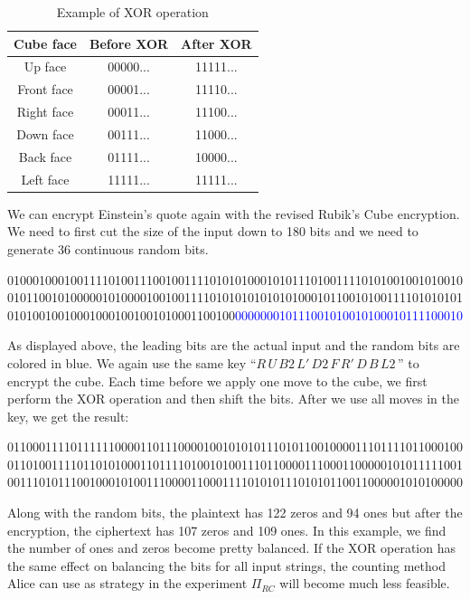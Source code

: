 \begin{table}[ht]
    \centering
    \begin{tabular}{|c|c|c|}
        \hline Cube face & Before XOR & After XOR \\
        \hline Up face & 00000... & 11111... \\
        \hline Front face & 00001... & 11110... \\
        \hline Right face & 00011... & 11100... \\
        \hline Down face & 00111... & 11000... \\
        \hline Back face & 01111... & 10000... \\
        \hline Left face & 11111... & 11111... \\
        \hline
    \end{tabular}
    \caption{Example of XOR operation}
    \label{tab:xor-example}
\end{table}
We can encrypt Einstein's quote again with the revised Rubik's Cube encryption. We need to first cut the size of the input down to 180 bits and we need to generate 36 continuous random bits.
\newpage
\begin{center}
    010001000100111101001110010011110101010001010111010011110101001001010010
    010110010100000101000010010011110101010101010100010110010100111101010101
    010100100100010001001001010001100100\textcolor{blue}{000000010111001010010100010111100010}
\end{center}
As displayed above, the leading bits are the actual input and the random bits are colored in blue. We again use the same key ``$R\,U\,B2\,L'\,D2\,F\,R'\,D\,B\,L2\,$'' to encrypt the cube. Each time before we apply one move to the cube, we first perform the XOR operation and then shift the bits. After we use all moves in the key, we get the result:
\begin{center}
    011000111101111110000110111000010010101011101011001000011101111011000100
    011010011110110101000110111101001010011101100001110001100000101011111001
    001110101110010001010011100001100011110101011101010110011000001010100000
\end{center}
Along with the random bits, the plaintext has 122 zeros and 94 ones but after the encryption, the ciphertext has 107 zeros and 109 ones. In this example, we find the number of ones and zeros become pretty balanced. If the XOR operation has the same effect on balancing the bits for all input strings, the counting method Alice can use as strategy in the experiment $\Pi_{RC}$ will become much less feasible.

